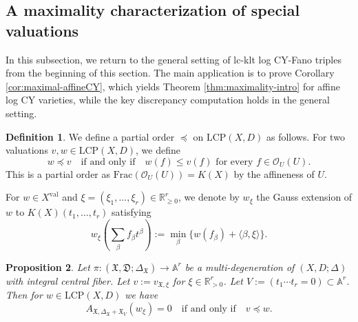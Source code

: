 \documentclass[reqno, 12pt]{amsart}
\newtheorem{prop}{Proposition}[section]
\newtheorem{lem}[prop]{Lemma}
\theoremstyle{definition}
\newtheorem{defn}[prop]{Definition}
\newcommand{\bR}{\mathbb{R}}
\newcommand{\bA}{\mathbb{A}}
\newcommand{\cO}{\mathcal{O}}
\newcommand{\fX}{\mathfrak{X}}
\newcommand{\fD}{\mathfrak{D}}
\newcommand{\val}{\mathrm{val}}
\newcommand{\LCP}{\mathrm{LCP}}
\numberwithin{equation}{section}
\begin{document}

\subsection{A maximality characterization of special valuations}

In this subsection, we return to the general setting of lc-klt log CY-Fano triples from the beginning of this section. The main application is to prove Corollary \ref{cor:maximal-affineCY}, which yields Theorem \ref{thm:maximality-intro} for affine log CY varieties, while the key discrepancy computation holds in the general setting.


\begin{defn}
We define a partial order $\preceq$ on $\LCP(X,D)$ as follows. For  two valuations
 $v,w\in \LCP(X,D)$, we define  
\[
w\preceq v \quad\textrm{if and only if} \quad w(f) \leq v(f)  \textrm{ for every }f\in \cO_U(U).
\]
This is a partial order as $\mathrm{Frac}(\cO_U(U)) = K(X)$ by the affineness of $U$. 
\end{defn}

For $w\in X^{\val}$ and
$\xi=(\xi_1,\ldots,\xi_r)\in\bR_{\geq 0}^r$, we denote by
$w_\xi$ the Gauss extension of $w$ to
$K(X)(t_1,\ldots,t_r)$ satisfying
\[
w_\xi\left(\sum_\beta f_\beta t^\beta\right)
:=
\min_\beta\{w(f_\beta)+\langle\beta,\xi\rangle\}.
\]

\begin{prop}\label{prop:max-log-disc}
Let $\pi:(\fX,\fD;\Delta_{\fX})\to \bA^r$ be a multi-degeneration of $(X,D;\Delta)$ with integral central fiber. Let $v:= v_{\fX,\xi}$ for $\xi\in \bR_{>0}^r$. Let $V:=(t_1\cdots t_r=0)\subset \bA^r$. 
Then for $w\in \LCP(X,D)$ we have 
\[
A_{\fX, \Delta_{\fX}+\fX_V}(w_{\xi}) = 0 \quad \textrm{if and only if}\quad v\preceq w.
\]
\end{prop}
\end{document}
